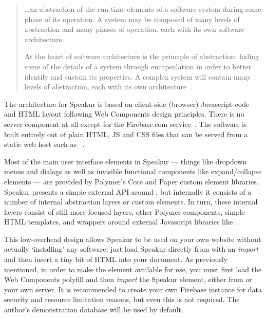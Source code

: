 \begin{quote}
\dots an abstraction of the run-time elements of a software system during some phase of its operation. A system may be composed of many levels of abstraction and many phases of operation, each with its own software architecture.

At the heart of software architecture is the principle of abstraction: hiding some of the details of a system through encapsulation in order to better identify and sustain its properties. A complex system will contain many levels of abstraction, each with its own architecture~\cite{fielding2000}.
\end{quote}

The architecture for Speakur is based on client-side (browser) Javascript code and HTML layout following Web Components design principles. 
There is no server component at all except for the Firebase.com service~\cite{firebasecontributors2015}.
The software is built entirely out of plain HTML, JS and CSS files that can be served from a static web host such as ~\cite{landers2015-d}.

Most of the main user interface elements in Speakur --- things like dropdown menus and dialogs as well as invisible functional components like expand/collapse elements  --- are provided by Polymer's Core and Paper custom element libraries.
Speakur presents a simple external API around ,
but internally it consists of a number of internal abstraction layers or custom elements.
In turn, these internal layers consist of still more focused layers, other Polymer components, simple HTML templates, and wrappers around external Javascript libraries like  .

This low-overhead design allows Speakur to be used on your own website without actually `installing' any software;
just load Speakur directly from  with an \textit{import}~\cite{landers2015-d}
and then insert a tiny bit of HTML into your document.
As previously mentioned, in order to make the 
 element available for use, you must first load the Web Components polyfill and then \textit{import} the Speakur element, either from  or your own server.
It is recommended to create your own Firebase instance for data security and resource limitation reasons, but even this is not required. 
The author's demonstration database will be used by default.


